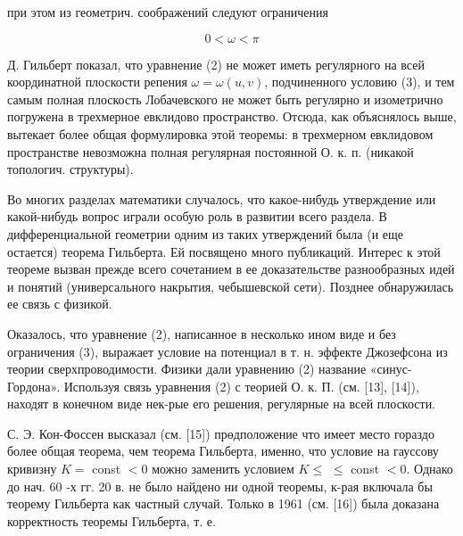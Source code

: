 \documentclass[10pt]{article}
\begin{document}
при этом из геометрич. соображений следуют ограничения

\[
0<\omega<\pi
\]

Д. Гильберт показал, что уравнение (2) не может иметь регулярного на всей координатной плоскости репения $\omega=\omega(u, v)$, подчиненного условию (3), и тем самым полная плоскость Лобачевского не может быть регулярно и изометрично погружена в трехмерное евклидово пространство. Отсюда, как объяснялось выше, вытекает более общая формулировка этой теоремы: в трехмерном евклидовом пространстве невозможна полная регулярная постоянной О. к. п. (никакой топологич. структуры).

Во многих разделах математики случалось, что какое-нибудь утверждение или какой-нибудь вопрос играли особую роль в развитии всего раздела. В дифференциальной геометрии одним из таких утверждений была (и еще остается) теорема Гильберта. Ей посвящено много публикаций. Интерес к этой теореме вызван прежде всего сочетанием в ее доказательстве разнообразных идей и понятий (универсального накрытия, чебышевской сети). Позднее обнаружилась ее связь с физикой.

Оказалось, что уравнение (2), написанное в несколько ином виде и без ограничения (3), выражает условие на потенциал в т. н. эффекте Джозефсона из теории сверхпроводимости. Физики дали уравнению (2) название «синус-Гордона». Используя связь уравнения (2) с теорией О. к. П. (см. [13], [14]), находят в конечном виде нек-рые его решения, регулярные на всей плоскости.

С. Э. Кон-Фоссен высказал (см. [15]) прөдположение что имеет место гораздо более общая теорема, чем теорема Гильберта, именно, что условие на гауссову кривизну $K=$ const $<0$ можно заменить условием $K \leqslant$ $\leqslant$ const $<0$. Однако до нач. 60 -х гг. 20 в. не было найдено ни одной теоремы, к-рая включала бы теорему Гильберта как частный случай. Только в 1961 (см. [16]) была доказана корректность теоремы Гильберта, т. е.
\end{document}

